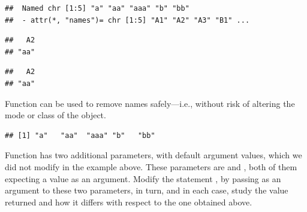 \documentclass[krantz2]{krantz}\usepackage{knitr}
\begin{document}
\begin{knitrout}\footnotesize
{}\color{fgcolor}\begin{kframe}
\begin{alltt}
\end{alltt}
\begin{verbatim}
##  Named chr [1:5] "a" "aa" "aaa" "b" "bb"
##  - attr(*, "names")= chr [1:5] "A1" "A2" "A3" "B1" ...
\end{verbatim}
\begin{alltt}
\hlstd{c.vec[}\hlstd{]}
\end{alltt}
\begin{verbatim}
##   A2
## "aa"
\end{verbatim}
\begin{alltt}
\hlstd{c.vec[}\hlstd{]}
\end{alltt}
\begin{verbatim}
##   A2
## "aa"
\end{verbatim}
\end{kframe}
\end{knitrout}

Function  can be used to remove names safely---i.e., without risk of altering the mode or class of the object.

\begin{knitrout}\footnotesize
{}\color{fgcolor}\begin{kframe}
\begin{alltt}
\end{alltt}
\begin{verbatim}
## [1] "a"   "aa"  "aaa" "b"   "bb"
\end{verbatim}
\end{kframe}
\end{knitrout}

\begin{playground}
Function  has two additional parameters, with default argument values, which we did not modify in the example above. These parameters are  and , both of them expecting a  value as an argument. Modify the statement , by passing  as an argument to these two parameters, in turn, and in each case, study the value returned and how it differs with respect to the one obtained above.
\end{playground}
\end{document}
